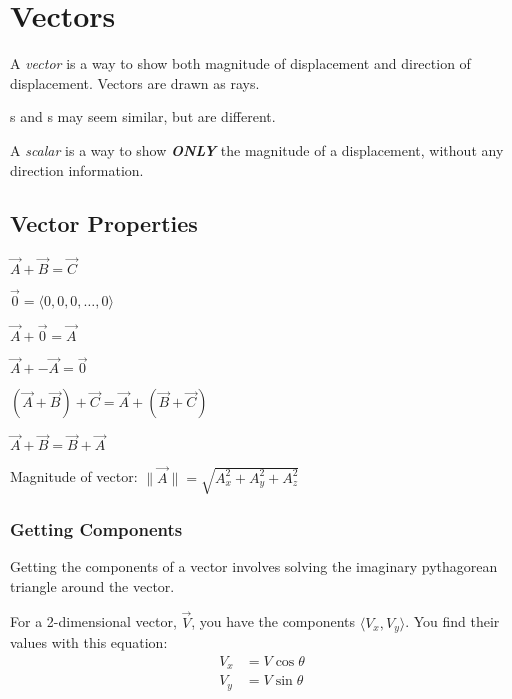 \section{Vectors}\label{sec:Vectors}
\begin{definition}[Vector]\label{def:Vector}
  A \emph{vector} is a way to show both magnitude of displacement and direction of displacement.
  Vectors are drawn as rays.
  \begin{remark}
    s and s may seem similar, but are different.
  \end{remark}
\end{definition}

\begin{definition}[Scalar]\label{def:Scalar}
  A \emph{scalar} is a way to show \emph{\textbf{ONLY}} the magnitude of a displacement, without any direction information.
\end{definition}

\subsection{Vector Properties}\label{subsec:Vector Properties}
\begin{propertylist}
  \item $\vec{A} + \vec{B} = \vec{C}$
  \item $\vec{0} = \langle 0, 0, 0, \ldots, 0 \rangle$
  \item $\vec{A} + \vec{0} = \vec{A}$
  \item $\vec{A} + -\vec{A} = \vec{0}$
  \item $\left( \vec{A} + \vec{B} \right) + \vec{C} = \vec{A} + \left( \vec{B} + \vec{C} \right)$
  \item $\vec{A} + \vec{B} = \vec{B} + \vec{A}$
  \item Magnitude of vector: $\lVert \vec{A} \rVert = \sqrt{A_{x}^{2} + A_{y}^{2} + A_{z}^{2}}$
\end{propertylist}

\subsubsection{Getting Components}\label{subsubsec:Vector Components}
Getting the components of a vector involves solving the imaginary pythagorean triangle around the vector.

For a 2-dimensional vector, $\vec{V}$, you have the components $\langle V_{x}, V_{y} \rangle$.
You find their values with this equation:
\begin{equation}\label{eq:Vector Components}
  \begin{aligned}
    V_{x} &= V \cos \theta \\
    V_{y} &= V \sin \theta
  \end{aligned}
\end{equation}


